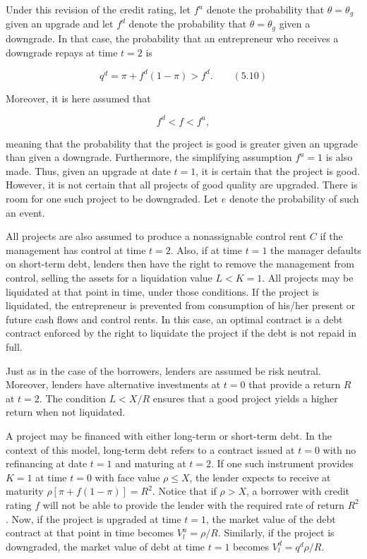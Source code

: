 \documentclass[11pt,a4paper]{article}
\begin{document}
Under this revision of the credit rating, let \(f^u\) denote the probability that
\(\theta = \theta_g\) given an upgrade and let \(f^d\) denote the probability that
\(\theta = \theta_g\) given a downgrade. In that case, the probability that an entrepreneur who
receives a downgrade repays at time \(t = 2\) is

\[q^d = \pi + f^d(1 - \pi) > f^d. \qquad (5.10)\]

Moreover, it is here assumed that

\[f^d < f < f^u,\]

meaning that the probability that the project is good is greater given an upgrade than given a
downgrade. Furthermore, the simplifying assumption \(f^u = 1\) is also made. Thus, given an upgrade
at date \(t = 1\), it is certain that the project is good. However, it is not certain that all
projects of good quality are upgraded. There is room for one such project to be downgraded. Let
\(e\) denote the probability of such an event.

All projects are also assumed to produce a nonassignable control rent \(C\) if the management has
control at time \(t = 2\). Also, if at time \(t = 1\) the manager defaults on short-term debt,
lenders then have the right to remove the management from control, selling the assets for a
liquidation value \(L < K = 1\). All projects may be liquidated at that point in time, under those
conditions. If the project is liquidated, the entrepreneur is prevented from consumption of his/her
present or future cash flows and control rents. In this case, an optimal contract is a debt contract
enforced by the right to liquidate the project if the debt is not repaid in full.

Just as in the case of the borrowers, lenders are assumed be risk neutral. Moreover, lenders have
alternative investments at \(t = 0\) that provide a return \(R\) at \(t = 2\). The condition
\(L < X/R\) ensures that a good project yields a higher return when not liquidated.

A project may be financed with either long-term or short-term debt. In the context of this model,
long-term debt refers to a contract issued at \(t = 0\) with no refinancing at date \(t = 1\) and
maturing at \(t = 2\). If one such instrument provides \(K = 1\) at time \(t = 0\) with face value
\(\rho \le X\), the lender expects to receive at maturity \(\rho[\pi + f(1 - \pi)] = R^2\). Notice
that if \(\rho > X\), a borrower with credit rating \(f\) will not be able to provide the lender
with the required rate of return \(R^2\). Now, if the project is upgraded at time \(t = 1\), the
market value of the debt contract at that point in time becomes \(V_l^u = \rho/R\). Similarly, if
the project is downgraded, the market value of debt at time \(t = 1\) becomes \(V_l^d = q^d\rho/R\).
\end{document}
